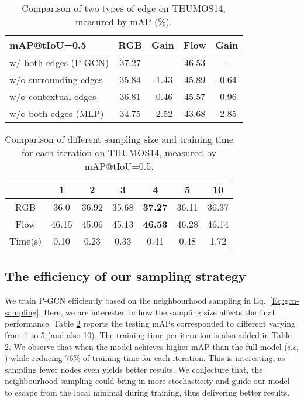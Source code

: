 \documentclass[10pt,twocolumn,letterpaper]{article}
\def\ie{\emph{i.e}\onedot} \def\Ie{\emph{I.e}\onedot}
\begin{document}
	\begin{table}[!tb]
		\centering
\caption{Comparison of two types of edge on THUMOS14, measured by mAP (\%).}
		\vspace{0.1cm}
\begin{tabular}{l|cc|cc}
			\hline
			mAP@tIoU=0.5                & RGB     & Gain      & Flow     & Gain        \\ \hline
			w/ both edges (P-GCN)    & 37.27   & -       & 46.53  &  - \\
			w/o surrounding edges   & 35.84   & -1.43      & 45.89  & -0.64 \\ 
			w/o contextual edges   & 36.81   &  -0.46     & 45.57   & -0.96 \\ 
			w/o both edges (MLP)             & 34.75   & -2.52     & 43.68      & -2.85 \\ \hline
		\end{tabular}
\label{Tab:surrounding}
	\end{table}
	
	\begin{table}[!t]
		\centering
		\tabcolsep 5pt \caption{Comparison of different sampling size and training time for each iteration on THUMOS14, measured by mAP@tIoU=0.5.}
		\vspace{0.1cm}
\begin{tabular}{c|cccccc}
			\hline
			  & 1 & 2 & 3 & 4 & 5 & 10 \\ \hline
			RGB  & 36.0  & 36.92 & 35.68 & \textbf{37.27} & 36.11 & 36.37\\
			Flow & 46.15 & 45.06 & 45.13 & \textbf{46.53} & 46.28 & 46.14\\
			Time(s) & 0.10 & 0.23 & 0.33 & 0.41 & 0.48 & 1.72 \\ \hline
		\end{tabular}
			 		\vspace{-0.2cm}
		\label{Tab:sampling}
	\end{table}
	
	\subsection{The efficiency of our sampling strategy}
	
We train P-GCN efficiently based on the neighbourhood sampling in Eq.~\eqref{Eq:gcn-sampling}. Here, we are interested in how the sampling size  affects the final performance. Table \ref{Tab:sampling} reports the testing mAPs corresponded to different  varying from 1 to 5 (and also 10). The training time per iteration is also added in Table \ref{Tab:sampling}. 
	We observe that when  the model achieves higher mAP than the full model (\ie, ) while reducing 76\% of training time for each iteration. This is interesting, as sampling fewer nodes even yields better results. We conjecture that, the neighbourhood sampling could bring in more stochasticity and guide our model to escape from the local minimal during training, thus delivering better results.
	
\end{document}
